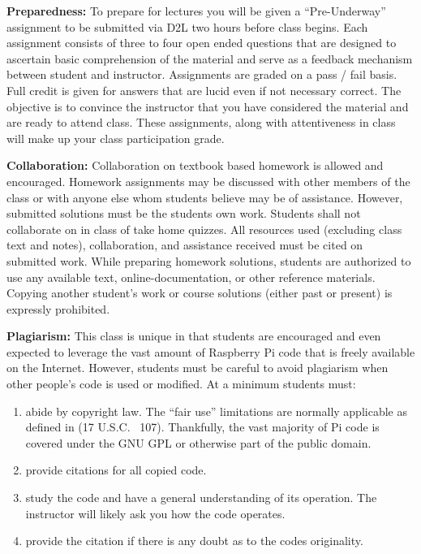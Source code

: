 \documentclass[12pt]{article}
\begin{document}
\vspace*{.15in}
\noindent\textbf{Preparedness:}  To prepare for lectures you will be given a “Pre-Underway” assignment to be submitted via D2L two hours before class begins. Each assignment consists of three to four open ended questions that are designed to ascertain basic comprehension of the material and serve as a feedback mechanism between student and instructor. Assignments are graded on a pass / fail basis. Full credit is given for answers that are lucid even if not necessary correct. The objective is to convince the instructor that you have considered the material and are ready to attend class. These assignments, along with attentiveness in class will make up your class participation grade.


\vspace*{.15in}
\noindent\textbf{Collaboration:} Collaboration on textbook based homework is allowed and encouraged. Homework assignments may be discussed with other members of the class or with anyone else whom students believe may be of assistance. However, submitted solutions must be the students own work. Students shall not collaborate on in class of take home quizzes. All resources used (excluding class text and notes), collaboration, and assistance received must be cited on submitted work. While preparing homework solutions, students are authorized to use any available text, online-documentation, or other reference materials. Copying another student’s work or course solutions (either past or present) is expressly prohibited.




\vspace*{.15in}
\noindent\textbf{Plagiarism:} This class is unique in that students are encouraged and even expected to leverage the vast amount of Raspberry Pi code that is freely available on the Internet.  However, students must be careful to avoid plagiarism when other people's code is used or modified.  At a minimum students must:
\begin{enumerate}
    \item abide by copyright law.  The “fair use” limitations are normally applicable as defined in (17 U.S.C. \textsection\ 107).  Thankfully, the vast majority of Pi code is covered under the GNU GPL or otherwise part of the public domain.

    \item provide citations for all copied code.

    \item study the code and have a general understanding of its operation.  The instructor will likely ask you how the code operates.

    \item provide the citation if there is any doubt as to the codes originality.
\end{enumerate}
\end{document}
